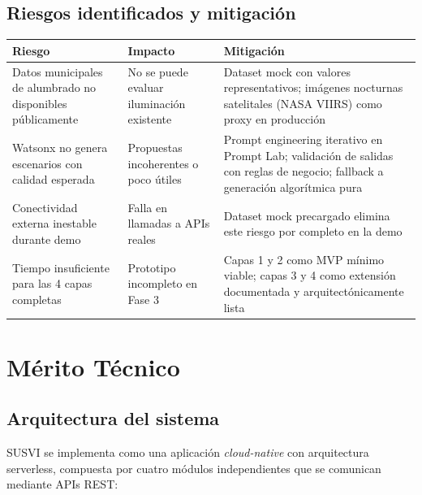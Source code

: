 \documentclass[12pt,a4paper]{article}
\begin{document}
\subsection{Riesgos identificados y mitigación}

\begin{table}[H]
\centering
\small
\renewcommand{\arraystretch}{1.3}
\begin{tabularx}{\textwidth}{X X X}
\toprule
\rowcolor{azuloscuro}
\color{white}\textbf{Riesgo} & \color{white}\textbf{Impacto} & \color{white}\textbf{Mitigación} \\
\midrule
Datos municipales de alumbrado no disponibles públicamente & No se puede evaluar iluminación existente & Dataset mock con valores representativos; imágenes nocturnas satelitales (NASA VIIRS) como proxy en producción \\
\rowcolor{fondoazul}
Watsonx no genera escenarios con calidad esperada & Propuestas incoherentes o poco útiles & Prompt engineering iterativo en Prompt Lab; validación de salidas con reglas de negocio; fallback a generación algorítmica pura \\
Conectividad externa inestable durante demo & Falla en llamadas a APIs reales & Dataset mock precargado elimina este riesgo por completo en la demo \\
\rowcolor{fondoazul}
Tiempo insuficiente para las 4 capas completas & Prototipo incompleto en Fase 3 & Capas 1 y 2 como MVP mínimo viable; capas 3 y 4 como extensión documentada y arquitectónicamente lista \\
\bottomrule
\end{tabularx}
\end{table}


\newpage
\section{Mérito Técnico}

\subsection{Arquitectura del sistema}

SUSVI se implementa como una aplicación \textit{cloud-native} con arquitectura serverless, compuesta por cuatro módulos independientes que se comunican mediante APIs REST:
\end{document}
